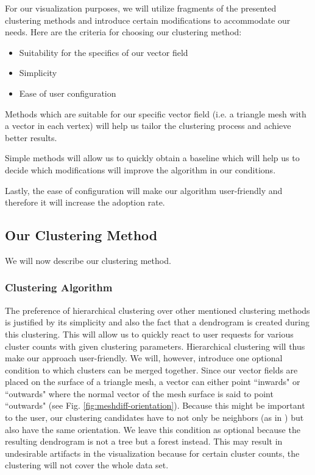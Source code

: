 For our visualization purposes, we will utilize fragments of the presented clustering methods and introduce certain modifications to accommodate our needs. Here are the criteria for choosing our clustering method:

\begin{itemize}
\item Suitability for the specifics of our vector field
\item Simplicity
\item Ease of user configuration
\end{itemize}

Methods which are suitable for our specific vector field (i.e. a triangle mesh with a vector in each vertex) will help us tailor the clustering process and achieve better results. 

Simple methods will allow us to quickly obtain a baseline which will help us to decide which modifications will improve the algorithm in our conditions. 

Lastly, the ease of configuration will make our algorithm user-friendly and therefore it will increase the adoption rate.

\subsection{Our Clustering Method}

We will now describe our clustering method.

\subsubsection{Clustering Algorithm}
\label{sec:analysis_clustering_algorithm}

The preference of hierarchical clustering over other mentioned clustering methods is justified by its simplicity and also the fact that a dendrogram is created during this clustering. This will allow us to quickly react to user requests for various cluster counts with given clustering parameters. Hierarchical clustering will thus make our approach user-friendly. We will, however, introduce one optional condition to which clusters can be merged together. Since our vector fields are placed on the surface of a triangle mesh, a vector can either point ``inwards" or ``outwards" where the normal vector of the mesh surface is said to point ``outwards" (see Fig. \ref{fig:meshdiff-orientation}). Because this might be important to the user, our clustering candidates have to not only be neighbors (as in \citet{Telea99}) but also have the same orientation. We leave this condition as optional because the resulting dendrogram is not a tree but a forest instead. This may result in undesirable artifacts in the visualization because for certain cluster counts, the clustering will not cover the whole data set.


